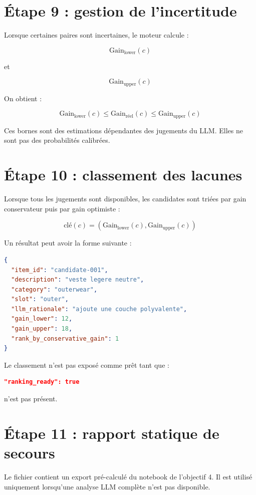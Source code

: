 \documentclass[11pt,a4paper]{article}
\newcommand{\pathcode}[1]{\texttt{\path{#1}}}
\begin{document}
\section{Étape 9 : gestion de l'incertitude}

Lorsque certaines paires sont incertaines, le moteur calcule :

\[
\mathrm{Gain}_{\mathrm{lower}}(c)
\]

et

\[
\mathrm{Gain}_{\mathrm{upper}}(c)
\]

On obtient :

\[
\mathrm{Gain}_{\mathrm{lower}}(c)
\leq
\mathrm{Gain}_{\mathrm{réel}}(c)
\leq
\mathrm{Gain}_{\mathrm{upper}}(c)
\]

Ces bornes sont des estimations dépendantes des jugements du LLM. Elles ne sont
pas des probabilités calibrées.

\section{Étape 10 : classement des lacunes}

Lorsque tous les jugements sont disponibles, les candidates sont triées par
gain conservateur puis par gain optimiste :

\[
\mathrm{clé}(c)
=
\left(
\mathrm{Gain}_{\mathrm{lower}}(c),
\mathrm{Gain}_{\mathrm{upper}}(c)
\right)
\]

Un résultat peut avoir la forme suivante :

\begin{lstlisting}[language=json]
{
  "item_id": "candidate-001",
  "description": "veste legere neutre",
  "category": "outerwear",
  "slot": "outer",
  "llm_rationale": "ajoute une couche polyvalente",
  "gain_lower": 12,
  "gain_upper": 18,
  "rank_by_conservative_gain": 1
}
\end{lstlisting}

Le classement n'est pas exposé comme prêt tant que :

\begin{lstlisting}[language=json]
"ranking_ready": true
\end{lstlisting}

n'est pas présent.

\section{Étape 11 : rapport statique de secours}

Le fichier \pathcode{gap\_report.json} contient un export pré-calculé du
notebook de l'objectif 4. Il est utilisé uniquement lorsqu'une analyse LLM
complète n'est pas disponible.
\end{document}
